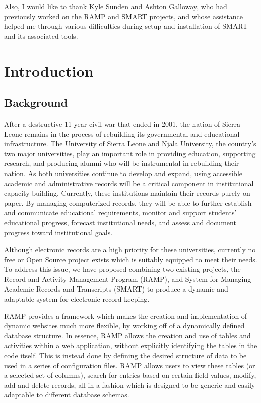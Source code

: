 \documentclass[12pt]{article}
\begin{document}
Also, I would like to thank Kyle Sunden and Ashton Galloway, who had previously worked on the RAMP and SMART projects, and whose assistance helped me through various difficulties during setup and installation of SMART and its associated tools.

\newpage

\tableofcontents

\newpage
{}
\section{Introduction}

\subsection{Background}

After a destructive 11-year civil war that ended in 2001, the nation of Sierra Leone remains in the process of rebuilding its governmental and educational infrastructure. The University of Sierra Leone and Njala University, the country's two major universities, play an important role in providing education, supporting research, and producing alumni who will be instrumental in rebuilding their nation. As both universities continue to develop and expand, using accessible academic and administrative records will be a critical component in institutional capacity building. Currently, these institutions maintain their records purely on paper. By managing computerized records, they will be able to further establish and communicate educational requirements, monitor and support students' educational progress, forecast institutional needs, and assess and document progress toward institutional goals.

Although electronic records are a high priority for these universities, currently no free or Open Source project exists which is suitably equipped to meet their needs. To address this issue, we have proposed combining two existing projects, the Record and Activity Management Program (RAMP), and System for Managing Academic Records and Transcripts (SMART) to produce a dynamic and adaptable system for electronic record keeping.

RAMP provides a framework which makes the creation and implementation of dynamic websites much more flexible, by working off of a dynamically defined database structure. In essence, RAMP allows the creation and use of tables and activities within a web application, without explicitly identifying the tables in the code itself. This is instead done by defining the desired structure of data to be used in a series of configuration files. RAMP allows users to view these tables (or a selected set of columns), search for entries based on certain field values, modify, add and delete records, all in a fashion which is designed to be generic and easily adaptable to different database schemas.
\end{document}

